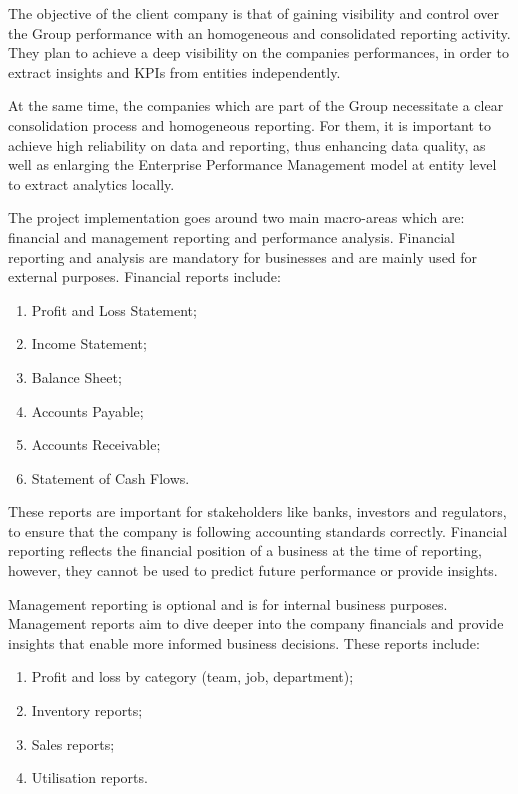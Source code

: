 \documentclass[12pt,a4paper,openright,twoside]{book}
\begin{document}
The objective of the client company is that of gaining visibility and control over the Group performance with an homogeneous and consolidated reporting activity.
%
They plan to achieve a deep visibility on the companies performances, in order to extract insights and KPIs from entities independently.

At the same time, the companies which are part of the Group necessitate a clear consolidation process and homogeneous reporting.
%
For them, it is important to achieve high reliability on data and reporting, thus enhancing data quality, as well as enlarging the Enterprise Performance Management model at entity level to extract analytics locally.

The project implementation goes around two main macro-areas which are: financial and management reporting and performance analysis.
%
Financial reporting and analysis are mandatory for businesses and are mainly used for external purposes.
%
Financial reports include:

\begin{enumerate}
    \item Profit and Loss Statement;
    \item Income Statement;
    \item Balance Sheet;
    \item Accounts Payable;
    \item Accounts Receivable;
    \item Statement of Cash Flows.
\end{enumerate}

These reports are important for stakeholders like banks, investors and regulators, to ensure that the company is following accounting standards correctly.
%
Financial reporting reflects the financial position of a business at the time of reporting, however, they cannot be used to predict future performance or provide insights.

Management reporting is optional and is for internal business purposes. 
%
Management reports aim to dive deeper into the company financials and provide insights that enable more informed business decisions. 
%
These reports include:

\begin{enumerate}
    \item Profit and loss by category (team, job, department);
    \item Inventory reports;
    \item Sales reports;
    \item Utilisation reports.
\end{enumerate}
\end{document}
